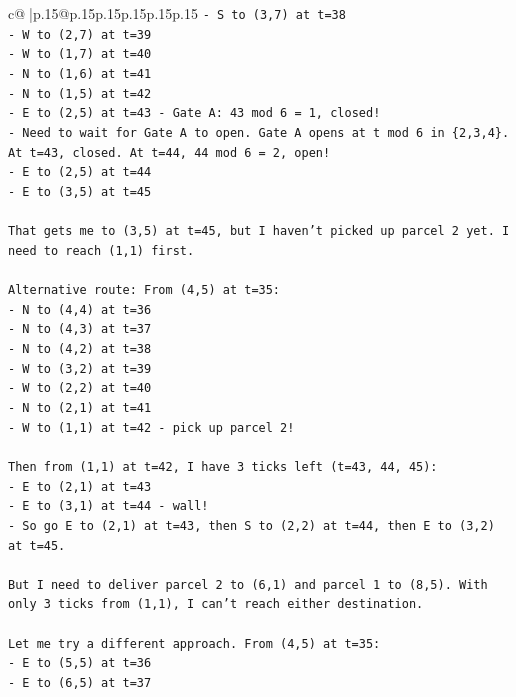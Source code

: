 \documentclass{article}
\begin{document}
{\begin{supertabular}{c@{$\;$}|p{.15\linewidth}@{}p{.15\linewidth}p{.15\linewidth}p{.15\linewidth}p{.15\linewidth}p{.15\linewidth}}
{{{\texttt{{-} S to (3,7) at t=38} \\
\texttt{{-} W to (2,7) at t=39} \\
\texttt{{-} W to (1,7) at t=40} \\
\texttt{{-} N to (1,6) at t=41} \\
\texttt{{-} N to (1,5) at t=42} \\
\texttt{{-} E to (2,5) at t=43 {-} Gate A: 43 mod 6 = 1, closed!} \\
\texttt{{-} Need to wait for Gate A to open. Gate A opens at t mod 6 in \{2,3,4\}. At t=43, closed. At t=44, 44 mod 6 = 2, open!} \\
\texttt{{-} E to (2,5) at t=44} \\
\texttt{{-} E to (3,5) at t=45} \\
\\ 
\texttt{That gets me to (3,5) at t=45, but I haven't picked up parcel 2 yet. I need to reach (1,1) first.} \\
\\ 
\texttt{Alternative route: From (4,5) at t=35:} \\
\texttt{{-} N to (4,4) at t=36} \\
\texttt{{-} N to (4,3) at t=37} \\
\texttt{{-} N to (4,2) at t=38} \\
\texttt{{-} W to (3,2) at t=39} \\
\texttt{{-} W to (2,2) at t=40} \\
\texttt{{-} N to (2,1) at t=41} \\
\texttt{{-} W to (1,1) at t=42 {-} pick up parcel 2!} \\
\\ 
\texttt{Then from (1,1) at t=42, I have 3 ticks left (t=43, 44, 45):} \\
\texttt{{-} E to (2,1) at t=43} \\
\texttt{{-} E to (3,1) at t=44 {-} wall!} \\
\texttt{{-} So go E to (2,1) at t=43, then S to (2,2) at t=44, then E to (3,2) at t=45.} \\
\\ 
\texttt{But I need to deliver parcel 2 to (6,1) and parcel 1 to (8,5). With only 3 ticks from (1,1), I can't reach either destination.} \\
\\ 
\texttt{Let me try a different approach. From (4,5) at t=35:} \\
\texttt{{-} E to (5,5) at t=36} \\
\texttt{{-} E to (6,5) at t=37} \\
}}}
\end{supertabular}}
\end{document}

